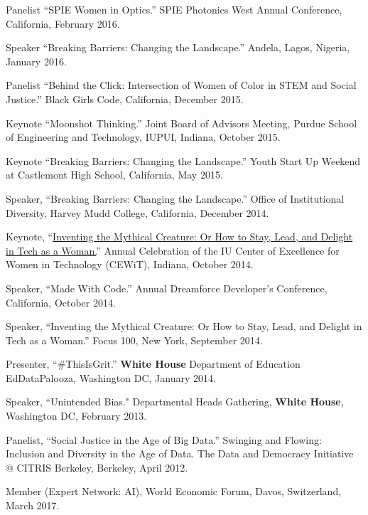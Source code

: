 \documentclass[11pt,article,oneside]{memoir}
\begin{document}
\ind Panelist ``SPIE Women in Optics.'' SPIE Photonics West Annual Conference, California, February 2016.

\ind Speaker ``Breaking Barriers: Changing the Landscape.'' Andela, Lagos, Nigeria, January 2016.

\ind Panelist ``Behind the Click: Intersection of Women of Color in STEM and Social Justice.'' Black Girls Code, California, December 2015.

\ind Keynote ``Moonshot Thinking.'' Joint Board of Advisors Meeting, Purdue School of Engineering and Technology, IUPUI, Indiana, October 2015.

\ind Keynote ``Breaking Barriers: Changing the Landscape.'' Youth Start Up Weekend at Castlemont High School, California, May 2015.

\ind Speaker, ``Breaking Barriers: Changing the Landscape.'' Office of Institutional Diversity, Harvey Mudd College, California, December 2014.

\ind Keynote, ``\href{https://www.youtube.com/watch?v=owXez6sIRbY&ab_channel=IUCEWIT}{Inventing the Mythical Creature: Or How to Stay, Lead, and Delight in Tech as a Woman.}'' Annual Celebration of the IU Center of Excellence for Women in Technology (CEWiT), Indiana, October 2014.

\ind Speaker, ``Made With Code.'' Annual Dreamforce Developer's Conference, California, October 2014.

\ind Speaker, ``Inventing the Mythical Creature: Or How to Stay, Lead, and Delight in Tech as a Woman.'' Focus 100, New York, September 2014.

\ind Presenter, ``\#ThisIsGrit.'' \textbf{White House} Department of Education EdDataPalooza, Washington DC, January 2014.

\ind Speaker, ``Unintended Bias." Departmental Heads Gathering, \textbf{White House}, Washington DC, February 2013.

\ind Panelist, ``Social Justice in the Age of Big Data.'' Swinging and Flowing: Inclusion and Diversity in the Age of Data. The Data and Democracy Initiative @ CITRIS Berkeley, Berkeley, April 2012.

\bigskip

\medskip

\ind Member (Expert Network: AI), World Economic Forum, Davos, Switzerland, March 2017.
\end{document}
